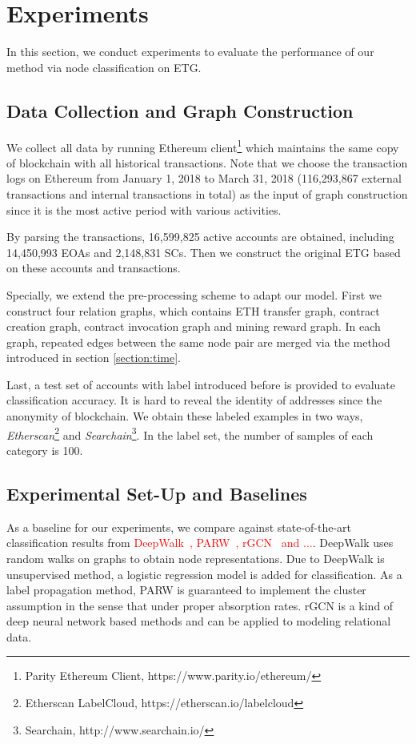 
\section{Experiments}
In this section, we conduct experiments to evaluate the performance of our method via node classification on ETG.

\subsection{Data Collection and Graph Construction}
We collect all data by running Ethereum client\footnote{Parity Ethereum Client, https://www.parity.io/ethereum/} which maintains the same copy of blockchain with all historical transactions. Note that we choose the transaction logs on Ethereum from January 1, 2018 to March 31, 2018 (116,293,867 external transactions and internal transactions in total) as the input of graph construction since it is the most active period with various activities.

By parsing the transactions, 16,599,825 active accounts are obtained, including 14,450,993 EOAs and 2,148,831 SCs. Then we construct the original ETG based on these accounts and transactions.

Specially, we extend the pre-processing scheme to adapt our model. First we construct four relation graphs, which contains ETH transfer graph, contract creation graph, contract invocation graph and mining reward graph. In each graph, repeated edges between the same node pair are merged via the method introduced in section \ref{section:time}.

Last, a test set of accounts with label introduced before is provided to evaluate classification accuracy. It is hard to reveal the identity of addresses since the anonymity of blockchain. We obtain these labeled examples in two ways, \emph{Etherscan}\footnote{Etherscan LabelCloud, https://etherscan.io/labelcloud} and \emph{Searchain}\footnote{Searchain, http://www.searchain.io/}. In the label set, the number of samples of each category is 100.

\subsection{Experimental Set-Up and Baselines}
As a baseline for our experiments, we compare against state-of-the-art classification results from \textcolor{red}{DeepWalk~\cite{perozzi2014deepwalk}, PARW~\cite{wu2012learning}, rGCN~\cite{schlichtkrull2018modeling} and ...}. DeepWalk uses random walks on graphs to obtain node representations. Due to DeepWalk is unsupervised method, a logistic regression model is added for classification. As a label propagation method, PARW is guaranteed to implement the cluster assumption in the sense that under proper absorption rates. rGCN is a kind of deep neural network based methods and can be applied to modeling relational data. 

